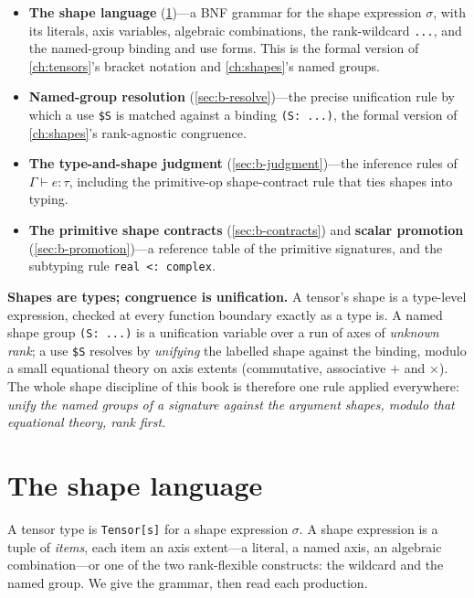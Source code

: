 \begin{itemize}[leftmargin=1.4em, nosep]
\item \textbf{The shape language} (\cref{sec:b-shapelang})---a BNF grammar for the
shape expression $\sigma$, with its literals, axis variables, algebraic
combinations, the rank-wildcard \lstinline[style=l4style]|...|, and the named-group
binding and use forms. This is the formal version of \cref{ch:tensors}'s bracket
notation and \cref{ch:shapes}'s named groups.
\item \textbf{Named-group resolution} (\cref{sec:b-resolve})---the precise
unification rule by which a use \lstinline[style=l4style]|$S| is matched against a
binding \lstinline[style=l4style]|(S: ...)|, the formal version of
\cref{ch:shapes}'s rank-agnostic congruence.
\item \textbf{The type-and-shape judgment} (\cref{sec:b-judgment})---the inference
rules of $\Gamma \vdash e : \tau$, including the primitive-op shape-contract rule
that ties shapes into typing.
\item \textbf{The primitive shape contracts} (\cref{sec:b-contracts}) and
\textbf{scalar promotion} (\cref{sec:b-promotion})---a reference table of the
primitive signatures, and the subtyping rule
\lstinline[style=l4style]|real <: complex|.
\end{itemize}

\begin{keyidea}
\textbf{Shapes are types; congruence is unification.} A tensor's shape is a
type-level expression, checked at every function boundary exactly as a type is. A
named shape group \lstinline[style=l4style]|(S: ...)| is a unification variable
over a run of axes of \emph{unknown rank}; a use \lstinline[style=l4style]|$S|
resolves by \emph{unifying} the labelled shape against the binding, modulo a small
equational theory on axis extents (commutative, associative $+$ and $\times$). The
whole shape discipline of this book is therefore one rule applied everywhere:
\emph{unify the named groups of a signature against the argument shapes, modulo
that equational theory, rank first.}
\end{keyidea}

\section{The shape language}
\label{sec:b-shapelang}

A tensor type is \lstinline[style=l4style]|Tensor[s]| for a shape expression
$\sigma$. A shape expression is a tuple of \emph{items}, each item an axis
extent---a literal, a named axis, an algebraic combination---or one of the two
rank-flexible constructs: the wildcard and the named group. We give the grammar,
then read each production.

